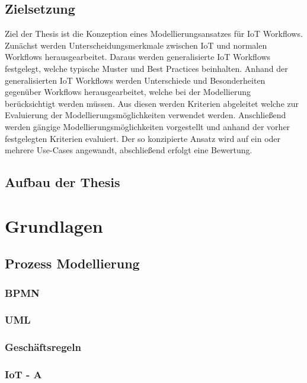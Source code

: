 \documentclass[a4paper, 12pt, twoside, headsepline=true]{scrartcl} %
\begin{document}
\subsection{Zielsetzung}
Ziel der Thesis ist die Konzeption eines Modellierungsansatzes für IoT
Workflows.
Zunächst werden Unterscheidungsmerkmale zwischen IoT und
normalen Workflows herausgearbeitet. Daraus werden
generalisierte IoT Workflows festgelegt, welche typische Muster und
Best Practices beinhalten. Anhand der generalisierten IoT Workflows
werden Unterschiede und Besonderheiten gegenüber Workflows
herausgearbeitet, welche bei der Modellierung berücksichtigt werden
müssen. Aus diesen werden Kriterien abgeleitet welche zur
Evaluierung der Modellierungsmöglichkeiten verwendet werden.
Anschließend werden gängige Modellierungsmöglichkeiten vorgestellt
und anhand der vorher festgelegten Kriterien evaluiert.
Der so konzipierte Ansatz wird auf ein oder mehrere Use-Cases
angewandt, abschließend erfolgt eine Bewertung.

\subsection{Aufbau der Thesis}

\newpage

\section{Grundlagen} \label{sec:section2}

\subsection{Prozess Modellierung}

\subsubsection{BPMN}

\subsubsection{UML}

\subsubsection{Geschäftsregeln}

\subsubsection{IoT - A}
\end{document}
